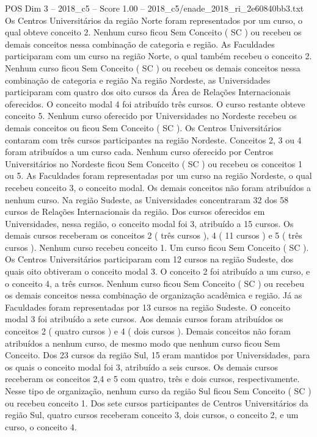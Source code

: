\begin{textsample}{POS Dim 3 – 2018\_c5 – Score 1.00 – 2018\_c5/enade\_2018\_ri\_2e60840bb3.txt}
Os Centros Universitários da região Norte foram representados por um curso, o qual obteve conceito 2.
Nenhum curso ficou Sem Conceito ( SC ) ou recebeu os demais conceitos nessa combinação de categoria e região.
As Faculdades participaram com um curso na região Norte, o qual também recebeu o conceito 2.
Nenhum curso ficou Sem Conceito ( SC ) ou recebeu os demais conceitos nessa combinação de categoria e região Na região Nordeste, as Universidades participaram com quatro dos oito cursos da Área de Relações Internacionais oferecidos.
O conceito modal 4 foi atribuído três cursos.
O curso restante obteve conceito 5.
Nenhum curso oferecido por Universidades no Nordeste recebeu os demais conceitos ou ficou Sem Conceito ( SC ).
Os Centros Universitários contaram com três cursos participantes na região Nordeste.
Conceitos 2, 3 ou 4 foram atribuídos a um curso cada.
Nenhum curso oferecido por Centros Universitários no Nordeste ficou Sem Conceito ( SC ) ou recebeu os conceitos 1 ou 5.
As Faculdades foram representadas por um curso na região Nordeste, o qual recebeu conceito 3, o conceito modal.
Os demais conceitos não foram atribuídos a nenhum curso.
Na região Sudeste, as Universidades concentraram 32 dos 58 cursos de Relações Internacionais da região.
Dos cursos oferecidos em Universidades, nessa região, o conceito modal foi 3, atribuído a 15 cursos.
Os demais cursos receberam os conceitos 2 ( três cursos ), 4 ( 11 cursos ) e 5 ( três cursos ).
Nenhum curso recebeu conceito 1.
Um curso ficou Sem Conceito ( SC ).
Os Centros Universitários participaram com 12 cursos na região Sudeste, dos quais oito obtiveram o conceito modal 3.
O conceito 2 foi atribuído a um curso, e o conceito 4, a três cursos.
Nenhum curso ficou Sem Conceito ( SC ) ou recebeu os demais conceitos nessa combinação de organização acadêmica e região.
Já as Faculdades foram representadas por 13 cursos na região Sudeste.
O conceito modal 3 foi atribuído a sete cursos.
Aos demais cursos foram atribuídos os conceitos 2 ( quatro cursos ) e 4 ( dois cursos ).
Demais conceitos não foram atribuídos a nenhum curso, de mesmo modo que nenhum curso ficou Sem Conceito.
Dos 23 cursos da região Sul, 15 eram mantidos por Universidades, para os quais o conceito modal foi 3, atribuído a seis cursos.
Os demais cursos receberam os conceitos 2,4 e 5 com quatro, três e dois cursos, respectivamente.
Nesse tipo de organização, nenhum curso da região Sul ficou Sem Conceito ( SC ) ou recebeu conceito 1.
Dos sete cursos participantes de Centros Universitários da região Sul, quatro cursos receberam conceito 3, dois cursos, o conceito 2, e um curso, o conceito 4.

\end{textsample}
